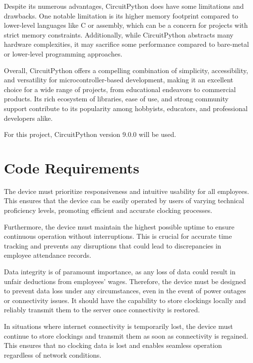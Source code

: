 Despite its numerous advantages, CircuitPython does have some limitations and drawbacks. One 
notable limitation is its higher memory footprint compared to lower-level languages like C or 
assembly, which can be a concern for projects with strict memory constraints. Additionally, while 
CircuitPython abstracts many hardware complexities, it may sacrifice some performance compared to 
bare-metal or lower-level programming approaches.

Overall, CircuitPython offers a compelling combination of simplicity, accessibility, and 
versatility for microcontroller-based development, making it an excellent choice for a wide range 
of projects, from educational endeavors to commercial products. Its rich ecosystem of libraries, 
ease of use, and strong community support contribute to its popularity among hobbyists, educators, 
and professional developers alike\cite{circuitpython_docs}.

For this project, CircuitPython version 9.0.0 will be used.

\section{Code Requirements}

The device must prioritize responsiveness and intuitive usability for all employees. This ensures 
that the device can be easily operated by users of varying technical proficiency levels, promoting 
efficient and accurate clocking processes.

Furthermore, the device must maintain the highest possible uptime to ensure continuous operation 
without interruptions. This is crucial for accurate time tracking and prevents any disruptions that 
could lead to discrepancies in employee attendance records.

Data integrity is of paramount importance, as any loss of data could result in unfair deductions 
from employees' wages. Therefore, the device must be designed to prevent data loss under any 
circumstances, even in the event of power outages or connectivity issues. It should have the 
capability to store clockings locally and reliably transmit them to the server once connectivity is 
restored.

In situations where internet connectivity is temporarily lost, the device must continue to store 
clockings and transmit them as soon as connectivity is regained. This ensures that no clocking data 
is lost and enables seamless operation regardless of network conditions.

